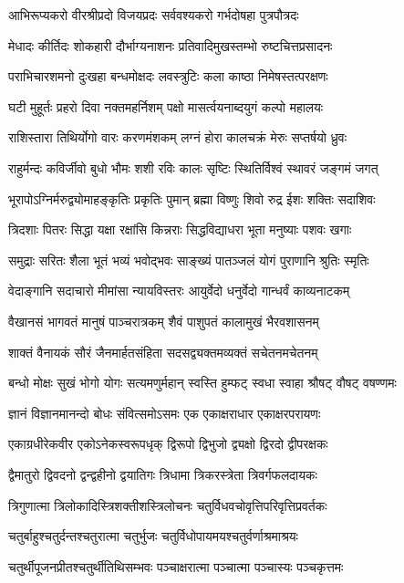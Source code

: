 \twolineshloka
{आभिरूप्यकरो वीरश्रीप्रदो विजयप्रदः}
{सर्ववश्यकरो गर्भदोषहा पुत्रपौत्रदः}

\twolineshloka
{मेधादः कीर्तिदः शोकहारी दौर्भाग्यनाशनः}
{प्रतिवादिमुखस्तम्भो रुष्टचित्तप्रसादनः}

\twolineshloka
{पराभिचारशमनो दुःखहा बन्धमोक्षदः}
{लवस्त्रुटिः कला काष्ठा निमेषस्तत्परक्षणः}

\twolineshloka
{घटी मुहूर्तः प्रहरो दिवा नक्तमहर्निशम्}
{पक्षो मासर्त्वयनाब्दयुगं कल्पो महालयः}

\twolineshloka
{राशिस्तारा तिथिर्योगो वारः करणमंशकम्}
{लग्नं होरा कालचक्रं मेरुः सप्तर्षयो ध्रुवः}

\twolineshloka
{राहुर्मन्दः कविर्जीवो बुधो भौमः शशी रविः}
{कालः सृष्टिः स्थितिर्विश्वं स्थावरं जङ्गमं जगत्}

\twolineshloka
{भूरापोऽग्निर्मरुद्व्योमाहङ्कृतिः प्रकृतिः पुमान्}
{ब्रह्मा विष्णुः शिवो रुद्र ईशः शक्तिः सदाशिवः}

\twolineshloka
{त्रिदशाः पितरः सिद्धा यक्षा रक्षांसि किन्नराः}
{सिद्धविद्याधरा भूता मनुष्याः पशवः खगाः}

\twolineshloka
{समुद्राः सरितः शैला भूतं भव्यं भवोद्भवः}
{साङ्ख्यं पातञ्जलं योगं पुराणानि श्रुतिः स्मृतिः}

\twolineshloka
{वेदाङ्गानि सदाचारो मीमांसा न्यायविस्तरः}
{आयुर्वेदो धनुर्वेदो गान्धर्वं काव्यनाटकम्}

\twolineshloka
{वैखानसं भागवतं मानुषं पाञ्चरात्रकम्}
{शैवं पाशुपतं कालामुखं भैरवशासनम्}

\twolineshloka
{शाक्तं वैनायकं सौरं जैनमार्हतसंहिता}
{सदसद्व्यक्तमव्यक्तं सचेतनमचेतनम्}

\twolineshloka
{बन्धो मोक्षः सुखं भोगो योगः सत्यमणुर्महान्}
{स्वस्ति हुम्फट् स्वधा स्वाहा श्रौषट् वौषट् वषण्णमः}

\twolineshloka
{ज्ञानं विज्ञानमानन्दो बोधः संवित्समोऽसमः}
{एक एकाक्षराधार एकाक्षरपरायणः}

\twolineshloka
{एकाग्रधीरेकवीर एकोऽनेकस्वरूपधृक्}
{द्विरूपो द्विभुजो द्व्यक्षो द्विरदो द्वीपरक्षकः}

\twolineshloka
{द्वैमातुरो द्विवदनो द्वन्द्वहीनो द्वयातिगः}
{त्रिधामा त्रिकरस्त्रेता त्रिवर्गफलदायकः}

\twolineshloka
{त्रिगुणात्मा त्रिलोकादिस्त्रिशक्तीशस्त्रिलोचनः}
{चतुर्विधवचोवृत्तिपरिवृत्तिप्रवर्तकः}

\twolineshloka
{चतुर्बाहुश्चतुर्दन्तश्चतुरात्मा चतुर्भुजः}
{चतुर्विधोपायमयश्चतुर्वर्णाश्रमाश्रयः}

\twolineshloka
{चतुर्थीपूजनप्रीतश्चतुर्थीतिथिसम्भवः}
{पञ्चाक्षरात्मा पञ्चात्मा पञ्चास्यः पञ्चकृत्तमः}

